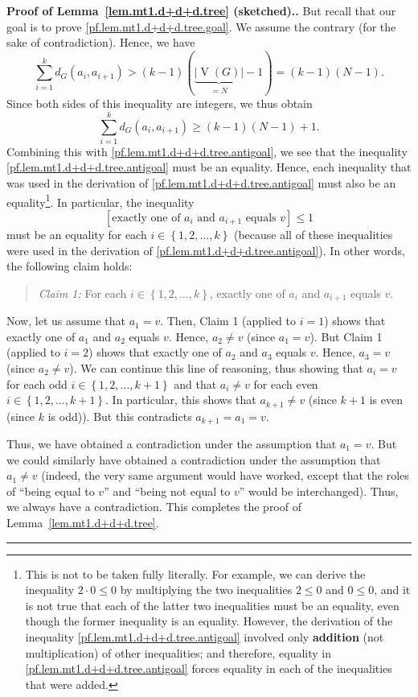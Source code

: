 \documentclass[numbers=enddot,12pt,final,onecolumn,notitlepage]{scrartcl}%
\theoremstyle{definition}
\newenvironment{statement}{\begin{quote}}{\end{quote}}
\newenvironment{proof}[1][Proof]{\noindent\textbf{#1.} }{\ \rule{0.5em}{0.5em}}
\let\sumnonlimits\sum
\renewcommand{\sum}{\sumnonlimits\limits}
\newcommand{\set}[1]{\left\{ #1 \right\}}
\newcommand{\abs}[1]{\left| #1 \right|}
\newcommand{\tup}[1]{\left( #1 \right)}
\newcommand{\ive}[1]{\left[ #1 \right]}
\newcommand{\verts}[1]{\operatorname{V}\left( #1 \right)}
\newcommand{\underbrack}[2]{\underbrace{#1}_{\substack{#2}}}
\begin{document}
\begin{proof}[Proof of Lemma~\ref{lem.mt1.d+d+d.tree} (sketched).]
But recall that our goal is to prove
\eqref{pf.lem.mt1.d+d+d.tree.goal}. We assume the contrary (for the
sake of contradiction). Hence, we have
\[
\sum_{i=1}^k d_G \tup{a_i, a_{i+1}}
> \tup{k-1} \tup{\underbrack{\abs{\verts{G}}}{= N} -1}
= \tup{k-1} \tup{N-1} .
\]
Since both sides of this
inequality are integers, we thus obtain
\[
\sum_{i=1}^k d_G \tup{a_i, a_{i+1}}
\geq \tup{k-1} \tup{N-1} + 1.
\]
Combining this with \eqref{pf.lem.mt1.d+d+d.tree.antigoal}, we see
that the inequality \eqref{pf.lem.mt1.d+d+d.tree.antigoal} must be an
equality. Hence, each inequality that was used in the derivation of
\eqref{pf.lem.mt1.d+d+d.tree.antigoal} must also be an
equality\footnote{This is not to be taken fully literally. For
example, we can derive the inequality $2\cdot 0 \leq 0$ by multiplying
the two inequalities $2 \leq 0$ and $0 \leq 0$, and it is not true
that each of the latter two inequalities must be an equality, even
though the former inequality is an equality.
However, the derivation of the inequality
\eqref{pf.lem.mt1.d+d+d.tree.antigoal} involved only
\textbf{addition} (not multiplication) of other inequalities; and
therefore, equality in \eqref{pf.lem.mt1.d+d+d.tree.antigoal} forces
equality in each of the inequalities that were added.}.
In particular, the inequality
\[
\ive{\text{exactly one of } a_i \text{ and } a_{i+1}
                     \text{ equals } v } \leq 1
\]
must be an equality for each $i \in \set{1, 2, \ldots, k}$ (because
all of these inequalities were used in the derivation of
\eqref{pf.lem.mt1.d+d+d.tree.antigoal}). In other words, the following
claim holds:
\begin{statement}
\textit{Claim 1:} For each $i \in \set{1, 2, \ldots, k}$, exactly one
of $a_i$ and $a_{i+1}$ equals $v$.
\end{statement}

Now, let us assume that $a_1 = v$. Then, Claim 1 (applied to $i=1$)
shows that exactly one of $a_1$ and $a_2$ equals $v$. Hence, $a_2 \neq
v$ (since $a_1 = v$). But Claim 1 (applied to $i=2$) shows that
exactly one of $a_2$ and $a_3$ equals $v$. Hence, $a_3 = v$ (since
$a_2 \neq v$). We can continue this line of reasoning, thus showing
that $a_i = v$ for each odd $i \in \set{1, 2, \ldots, k+1}$ and that
$a_i \neq v$ for each even $i \in \set{1, 2, \ldots, k+1}$.
In particular, this shows that $a_{k+1} \neq v$ (since $k+1$ is even
(since $k$ is odd)).
But this contradicts $a_{k+1} = a_1 = v$.

Thus, we have obtained a contradiction under the assumption that
$a_1 = v$. But we could similarly have obtained a contradiction under
the assumption that $a_1 \neq v$ (indeed, the very same argument would
have worked, except that the roles of ``being equal to $v$'' and
``being not equal to $v$'' would be interchanged). Thus, we always
have a contradiction. This completes the proof of
Lemma~\ref{lem.mt1.d+d+d.tree}.
\end{proof}
\end{document}
